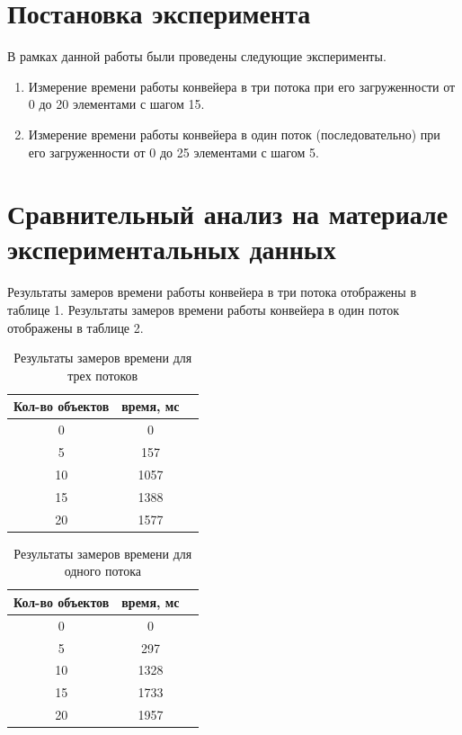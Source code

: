 \documentclass[a4paper,14pt]{report}
\begin{document}
\section*{Постановка эксперимента}

В рамках данной работы были проведены следующие эксперименты.

\begin{enumerate}
	\item Измерение времени работы конвейера в три потока при его загруженности от 0 до 20 элементами с шагом 15.
	\item Измерение времени работы конвейера в один поток (последовательно) при его загруженности от 0 до 25 элементами с шагом 5.
\end{enumerate}

\section*{Сравнительный анализ на материале экспериментальных данных}

Результаты замеров времени работы конвейера в три потока отображены в таблице 1. Результаты замеров времени работы конвейера в один поток отображены в таблице 2.

\begin{table}
	\caption{Результаты замеров времени для трех потоков}
	\begin{center}
	\tabcolsep=0.11cm
		\begin{tabular}{|c | c | c |}
	 	\hline
		Кол-во объектов & время, мс  \\ [0.5ex]
	 	\hline\hline
		0 & 0 \\ \hline
		5 & 157 \\ \hline
		10 & 1057 \\ \hline
		15 & 1388 \\ \hline
		20 & 1577 \\ \hline
	\end{tabular}
	\end{center}
\end{table}

\begin{table}
	\caption{Результаты замеров времени для одного потока}
	\begin{center}
	\tabcolsep=0.11cm
		\begin{tabular}{|c | c | c |}
	 	\hline
		Кол-во объектов & время, мс  \\ [0.5ex]
	 	\hline\hline
		0 & 0 \\ \hline
		5 & 297 \\ \hline
		10 & 1328 \\ \hline
		15 & 1733 \\ \hline
		20 & 1957 \\ \hline
	\end{tabular}
	\end{center}
\end{table}
\end{document}
